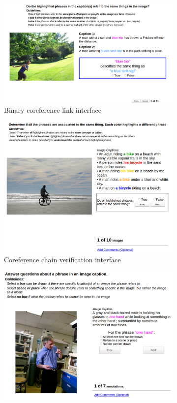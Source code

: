 \begin{figure}
  \centering
  \begin{subfigure}{.45\textwidth}
    \centering
    \includegraphics[width=.8\linewidth]{figures/flickr30k-example-coref-annotation.png}
    \caption{Binary coreference link interface}
    \label{fig:flickr30k-example-coref-annotation}
  \end{subfigure}
  \begin{subfigure}{.45\textwidth}
    \centering
    \includegraphics[width=.8\linewidth]{figures/flickr30k-example-coref-verification.png}
    \caption{Coreference chain verification interface}
    \label{fig:flickr30k-example-coref-verification}
  \end{subfigure}
  \begin{subfigure}{.45\textwidth}
    \centering
    \includegraphics[width=.8\linewidth]{figures/flickr30k-example-box-requirement.png}

\end{subfigure}
\end{figure}

